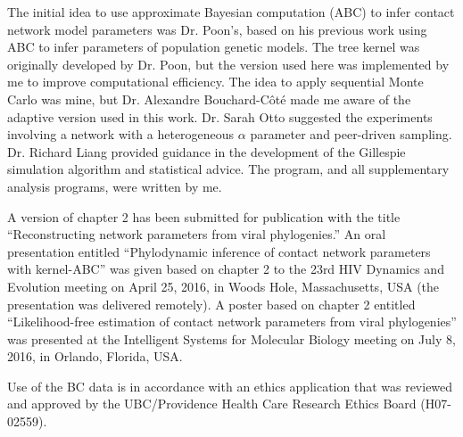 The initial idea to use approximate Bayesian computation (ABC) to infer contact
network model parameters was Dr. Poon's, based on his previous work using ABC
to infer parameters of population genetic models. The tree kernel was
originally developed by Dr. Poon, but the version used here was implemented by
me to improve computational efficiency. The idea to apply sequential Monte
Carlo was mine, but Dr. Alexandre Bouchard-C\^ot\'e made me aware of the
adaptive version used in this work. Dr. Sarah Otto suggested the experiments
involving a network with a heterogeneous $\alpha$ parameter and peer-driven
sampling. Dr. Richard Liang provided guidance in the development of the
Gillespie simulation algorithm and statistical advice. The 
program, and all supplementary analysis programs, were written by me.

A version of chapter 2 has been submitted for publication with the title
``Reconstructing network parameters from viral phylogenies.'' An oral
presentation entitled ``Phylodynamic inference of contact network parameters
with kernel-ABC'' was given based on chapter 2 to the 23rd HIV Dynamics and
Evolution meeting on April 25, 2016, in Woods Hole, Massachusetts, USA (the
presentation was delivered remotely). A poster based on chapter 2 entitled
``Likelihood-free estimation of contact network parameters from viral
phylogenies'' was presented at the Intelligent Systems for Molecular Biology
meeting on July 8, 2016, in Orlando, Florida, USA.

Use of the BC data is in accordance with an ethics application that was
reviewed and approved by the UBC/Providence Health Care Research Ethics Board
(H07-02559). 

